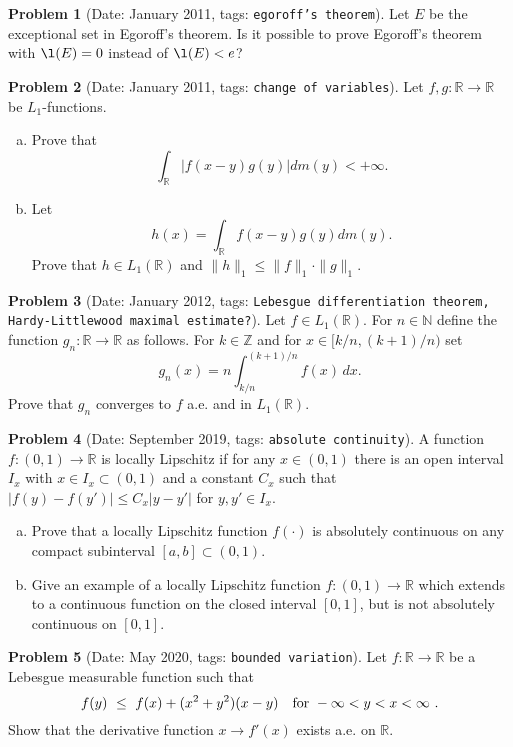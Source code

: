 \documentclass[11pt, notitlepage]{article}
\theoremstyle{definition}
\theoremstyle{definition}
\theoremstyle{definition}
\newtheorem{probstate}{Problem}
\theoremstyle{remark}
\newenvironment{problem}[2]{
    \begin{probstate}[Date: #1, tags: \texttt{#2}]
}
{
  \end{probstate}
}
\newcommand{\R}{\mathbb{R}}
\newcommand{\Z}{\mathbb{Z}}
\newcommand{\N}{\mathbb{N}}
\begin{document}
\begin{problem}{January 2011}{egoroff's theorem}
  Let $E$ be the exceptional set in Egoroff's theorem.
    Is it possible to prove Egoroff's theorem with
    $\l(E)=0$ instead of $\l(E) < e$?
\end{problem}


\begin{problem}{January 2011}{change of variables}
  Let $f,g: \mathbb R \rightarrow \mathbb R$ be $L_1$-functions.
  \begin{enumerate}[(a)]
\item Prove that
\[
\int_{\mathbb R} |f(x-y)g(y)| dm(y) < +\infty.
\]
  \item Let
\[
h(x)= \int_{\mathbb R} f(x-y)g(y) dm(y).
\]
Prove that $h \in L_1(\mathbb R)$ and $\|h\|_1 \le \|f\|_1 \cdot \|g\|_1$.
\end{enumerate}
\end{problem}

\begin{problem}{January 2012}{Lebesgue differentiation theorem, Hardy-Littlewood maximal estimate?}
  Let  $f \in L_1(\R)$.
  For $n \in \N$ define the function $g_n: \R \to \R$ as follows.  For $k \in \Z$ and for $x \in [k/n,(k+1)/n)$ set
\[
 g_n(x)=n \int_{k/n}^{(k+1)/n} f (x) \, dx.
\]
Prove that $g_n$ converges to $f$ a.e. and in $L_1(\R)$.
\end{problem}


\begin{problem}{September 2019}{absolute continuity}
   A function $f:(0,1)\to\mathbb{R}$ is locally Lipschitz if for   any $x\in(0,1)$ there is an open interval $I_x$ with $x\in I_x\subset (0,1)$ and a constant $C_x$ such that $|f(y)-f(y')|\le C_x|y-y'|$ for $y,y'\in I_x$.

\begin{enumerate}[(a)]
\item Prove that a locally Lipschitz function $f(\cdot)$ is absolutely continuous on any compact subinterval
$[a,b]\subset (0,1)$.

\item  Give an example of a locally Lipschitz function $f:(0,1)\to\mathbb{R}$ which extends to a continuous function on the closed interval $[0,1]$, but is not absolutely continuous on $[0,1]$.
\end{enumerate}
\end{problem}

\begin{problem}{May 2020}{bounded variation}
  Let $f:\mathbb{R}\to\mathbb{R}$ be a Lebesgue measurable function such that
$$
f(y) \ \le \ f(x)+(x^2+y^2)(x-y) \quad {\rm for \ } -\infty<y<x<\infty \ .
$$
Show that the derivative function $x\to f'(x)$ exists a.e. on $\mathbb{R}$.
\end{problem}
\end{document}
